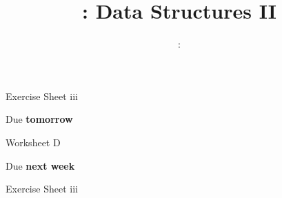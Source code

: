 \usepackage{../../beamerthemeFalmouthGamesAcademy}
\usepackage{multimedia}
\graphicspath{ {../../} }

\lstset{language=Python
}

\usepackage[normalem]{ulem}
\usepackage{wasysym}

\usepackage{algpseudocode}

\usepackage{pdfpages}

\usetikzlibrary{arrows,automata}
\usetikzlibrary{tikzmark,calc}




\title{\sessionnumber: Data Structures II}
\subtitle{\modulecode: \moduletitle}

\frame{\titlepage} 

\begin{frame}{Exercise Sheet iii}
    \begin{center}
        Due \textbf{tomorrow}
    \end{center}
\end{frame}


%


\begin{frame}{Worksheet D}
    \begin{center}
        Due \textbf{next week}
    \end{center}
\end{frame}

\begin{frame}{Exercise Sheet iii}
\end{frame}


